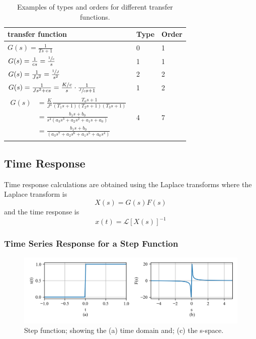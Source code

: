\documentclass[12pt,letter]{article}
\numberwithin{ex}{section} %
\numberwithin{re}{section} %
\newcommand{\Laplace}[1]{\ensuremath{\mathcal{L}{\left[#1\right]}}}
\numberwithin{equation}{section}	%
\begin{document}
\begin{table}[H]
\centering
\label{table:types_and_orders}
\caption{Examples of types and orders for different transfer functions.}
\begin{tabular}{@{}lll@{}}
\toprule
transfer function & Type & Order \\ \midrule
 $G(s) = \frac{1}{Ts+1}$& 0 & 1 \\
 $G(s) = \frac{1}{cs} =    \frac{\sfrac{1}{c}}{s} $  & 1 & 1 \\
  $G(s) = \frac{1}{Js^2} = \frac{\sfrac{1}{J}}{s^2}$ & 2 & 2 \\
 $G(s) = \frac{1}{Js^2 + cs} = \frac{K/c}{s} \cdot \frac{1}{\sfrac{J}{c}s+1}$ & 1 & 2 \\
 \parbox{3cm}{\begin{align}
    G(s) &= \frac{K}{J^4} \frac{T_a s + 1}{(T_1s+1)(T_2s+1)(T_3s+1)} \nonumber \\
     &= \frac{b_1 s + b_0}{s^4 (a_3 s^3 + a_2 s^2 + a_1 s + a_0) } \nonumber \\
 	&= \frac{b_1 s + b_0}{(a_3 s^7 + a_2 s^6 + a_1 s^5 + a_0s^4) } \nonumber
  \end{align}}& 4 & 7 \\ \bottomrule
\end{tabular}
\end{table}
\subsection{Time Response}


Time response calculations are obtained using the Laplace transforms where the Laplace transform is
\begin{equation}
X(s) = G(s)F(s)
\end{equation}
and the time response is 
\begin{equation}
x(t) = \Laplace{X(s)}^{-1}
\end{equation}

\subsubsection{Time Series Response for a Step Function}

		\begin{figure}[H]
			\centering
			\includegraphics[width=6.5in]{../figures/T_and_S_space_step_function}
			\caption{Step function; showing the (a) time domain and; (c) the s-space.}
			\label{fig:T_and_S_space_step_function}
		\end{figure}
\end{document}
